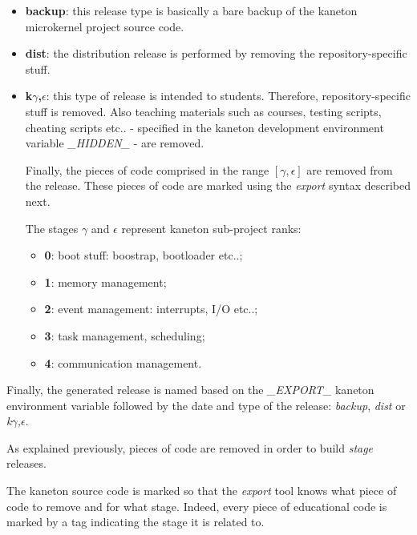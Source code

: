 \begin{itemize}
  \item
    \textbf{backup}: this release type is basically a bare backup of
    the kaneton microkernel project source code.
  \item
    \textbf{dist}: the distribution release is performed by removing
    the repository-specific stuff.
  \item
    \textbf{k}$\gamma$\textbf{,}$\epsilon$: this type of release is intended
    to students. Therefore, repository-specific stuff is removed. Also
    teaching materials such as courses, testing scripts, cheating scripts
    etc.. - specified in the kaneton development environment variable
    \textit{\_HIDDEN\_} - are removed.

    \-

    Finally, the pieces of code comprised in the range $[\gamma,\epsilon]$
    are removed from the release. These pieces of code are marked using the
    \textit{export} syntax described next.

    \-

    The stages $\gamma$ and $\epsilon$ represent kaneton sub-project ranks:

    \begin{itemize}
      \item
	\textbf{0}: boot stuff: boostrap, bootloader etc..;
      \item
	\textbf{1}: memory management;
      \item
	\textbf{2}: event management: interrupts, I/O etc..;
      \item
	\textbf{3}: task management, scheduling;
      \item
	\textbf{4}: communication management.
    \end{itemize}
\end{itemize}

Finally, the generated release is named based on the \textit{\_EXPORT\_}
kaneton environment variable followed by the date and type of the release:
\textit{backup}, \textit{dist} or \textit{k}$\gamma$\textit{,}$\epsilon$.



As explained previously, pieces of code are removed in order to build
\textit{stage} releases.

The kaneton source code is marked so that the \textit{export} tool knows
what piece of code to remove and for what stage. Indeed, every piece of
educational code is marked by a tag indicating the stage it is related to.

